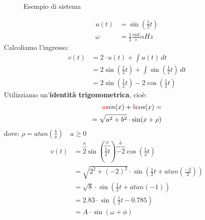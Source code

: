 \documentclass[a4paper]{article}
\begin{document}
\begin{example}
\begin{figure}[H]
    \caption{Esempio di sistema}
  \end{figure}
  \[
  \begin{aligned}
    u(t) &= \sin\left(\frac{1}{2}t\right)\\
    \omega &= \frac{1}{2} \frac{rad}{s} \alpha Hz
  \end{aligned}
  \] 
  Calcoliamo l'ingresso:
  \[
  \begin{aligned}
    v(t) &= 2 \cdot u(t) + \int u(t) \,dt\\
         &= 2 \sin\left(\frac{1}{2}t\right) + \int \sin\left(\frac{1}{2}t\right) \,dt\\
         &= 2 \sin\left(\frac{1}{2}t\right) - 2 \cos\left(\frac{1}{2}t\right)
  \end{aligned}
  \] 
  Utilizziamo un'\textbf{identità trigonometrica}, cioè:
  \[
    \begin{aligned}
      \color{red}a \color{black} sin(x) + \color{red} b \color{black} cos(x) =\\
      = \sqrt{a^2 + b^2} \cdot \sin(x + \rho )
    \end{aligned}
  \] 
  dove: \( \rho = atan\left(\frac{b}{a}\right) \quad a \ge 0 \) 
  \[
  \begin{aligned}
    v(t) &= \overbrace{2}^{a} \sin\left(\overbrace{\frac{1}{2}t}^{x}\right) \overbrace{- 2}^{b} \cos(\frac{1}{2}t)\\
         &= \sqrt{2^2 + (-2)^2} \cdot  \sin\left(\frac{1}{2}t + atan\left(\frac{-2}{2}\right)\right)\\
         &= \sqrt{8} \cdot  \sin\left(\frac{1}{2}t + atan(-1)\right)\\
         &= 2.83 \cdot \sin\left(\frac{1}{2}t - 0.785\right)\\
         &= A \cdot \sin(\omega + \phi)
  \end{aligned}
  \] 
\end{example}
\end{document}
